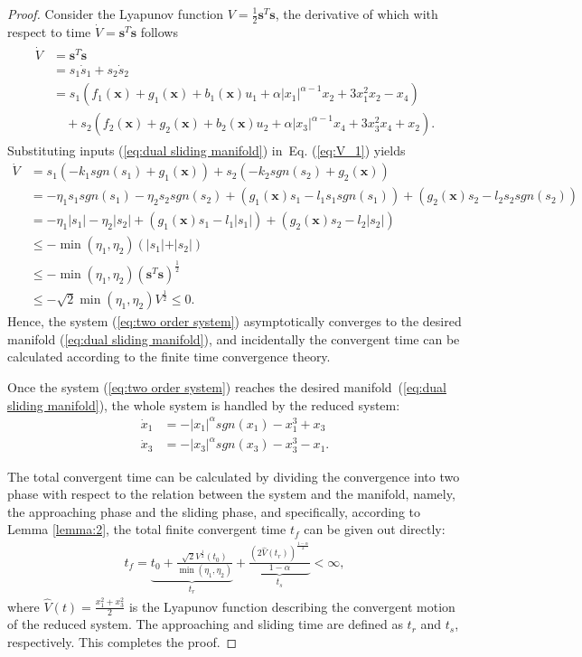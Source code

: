 \documentclass[3p]{elsarticle}
\theoremstyle{plain}
\theoremstyle{remark}
\begin{document}
\begin{proof}
Consider the Lyapunov function $V=\frac{1}{2}{\bm s}^T\bm s$, the derivative of which with respect to time $\dot V = {\bm s}^T \bm {\dot s}$ follows
\begin{align}
\begin{split}
\dot V &= {\bm s}^T\dot{\bm  s}\\
&=s_1\dot s_1+s_2\dot s_2\\
&=s_1(f_1(\bm x)+g_1(\bm x)+b_1(\bm x)u_1+\alpha\vert x_1\vert^{\alpha-1}x_2+3x_1^2x_2-x_4)\\
&\quad +s_2(f_2(\bm x)+g_2(\bm x)+b_2(\bm x)u_2+\alpha\vert x_3\vert^{\alpha-1}x_4+3x_3^2x_4+x_2).\label{eq:V_1}
\end{split}
\end{align}
Substituting inputs (\ref{eq:dual sliding manifold}) in~Eq. (\ref{eq:V_1}) yields
\begin{align*}
\dot V &= s_1(-k_1sgn(s_1)+g_1(\bm x))+s_2(-k_2sgn(s_2)+g_2(\bm x))\\
&= -\eta_1s_1sgn(s_1)-\eta_2s_2sgn(s_2)+(g_1(\bm x)s_1 - l_1s_1sgn(s_1))+(g_2(\bm x)s_2 - l_2s_2sgn(s_2))\\
&= -\eta_1\vert s_1\vert-\eta_2\vert s_2\vert+(g_1(\bm x)s_1 - l_1\vert s_1\vert)+(g_2(\bm x)s_2 - l_2\vert s_2\vert)\\
&\le - \min(\eta_1,\eta_2)(\vert s_1\vert+\vert s_2\vert)\\
&\le -\min(\eta_1,\eta_2)({\bm s}^T\bm s)^\frac{1}{2}\\
&\le -\sqrt{2}\min(\eta_1,\eta_2)V^\frac{1}{2}\le 0.
\end{align*}
Hence, the system (\ref{eq:two order system}) asymptotically converges to the desired manifold (\ref{eq:dual sliding manifold}), and incidentally the convergent time can be calculated according to the finite time convergence theory.\par
Once the system (\ref{eq:two order system}) reaches the desired manifold~(\ref{eq:dual sliding manifold}), the whole system is handled by the reduced system:
\begin{align*}
\dot x_1&=-\vert x_1\vert^\alpha sgn(x_1)-x_1^3+x_3\\
\dot x_3&=-\vert x_3\vert^\alpha sgn(x_3)-x_3^3-x_1.
\end{align*}\par
The total convergent time can be calculated by dividing the convergence into two phase with respect to the relation between the system and the manifold, namely, the approaching phase and the sliding phase, and specifically, according to Lemma \ref{lemma:2}, the total finite convergent time $t_f$ can be given out directly:
\begin{align}
t_f = \underbrace{t_0+\frac{\sqrt{2}V^{\frac{1}{2}}(t_0)}{\min(\eta_1,\eta_2)}}_{t_r}+\underbrace{\frac{(2\hat V(t_r))^{\frac{1-\alpha}{2}}}{1-\alpha}}_{t_s}<\infty,
\end{align}
where $\hat V(t) = \frac{x_1^2+x_3^2}{2}$ is the Lyapunov function describing the convergent motion of the reduced system. The approaching and sliding time are defined as $t_r$ and $t_s$, respectively. This completes the proof.
\end{proof}
\end{document}
